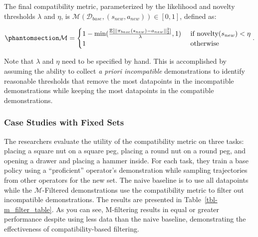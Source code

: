 \documentclass[
  letterpaper,
  numbers=noenddot,
  DIV=11]{scrreprt}
\theoremstyle{plain}
\theoremstyle{definition}
\theoremstyle{remark}
\begin{document}
The final compatibility metric, parameterized by the likelihood and
novelty thresholds \(\lambda\) and \(\eta\), is
\(\mathcal{M}(\mathcal{D}_{base}, (s_{new}, a_{new})) \in [0, 1]\),
defined as:

\begin{equation}\phantomsection\label{eq-eq3.63}{\begin{aligned}
    \mathcal{M} = \begin{cases} 
        1 - \min(\frac{\mathbb{E}[|| \pi_{base}(s_{new}) - a_{new} ||^2_2]}{\lambda}, 1) & \text{ if } \text{novelty}(s_{new}) < \eta \\
        1 & \text{ otherwise }
       \end{cases}.
\end{aligned}}\end{equation}

Note that \(\lambda\) and \(\eta\) need to be specified by hand. This is
accomplished by assuming the ability to collect \emph{a priori
incompatible} demonstrations to identify reasonable thresholds that
remove the most datapoints in the incompatible demonstrations while
keeping the most datapoints in the compatible demonstrations.

\subsubsection{Case Studies with Fixed
Sets}\label{case-studies-with-fixed-sets}

The researchers evaluate the utility of the compatibility metric on
three tasks: placing a square nut on a square peg, placing a round nut
on a round peg, and opening a drawer and placing a hammer inside. For
each task, they train a base policy using a ``proficient'' operator's
demonstration while sampling trajectories from other operators for the
new set. The naive baseline is to use all datapoints while the
\(\mathcal{M}\)-Filtered demonstrations use the compatibility metric to
filter out incompatible demonstrations. The results are presented in
Table~\ref{tbl-m_filter_table}. As you can see, M-filtering results in
equal or greater performance despite using less data than the naive
baseline, demonstrating the effectiveness of compatibility-based
filtering.
\end{document}
